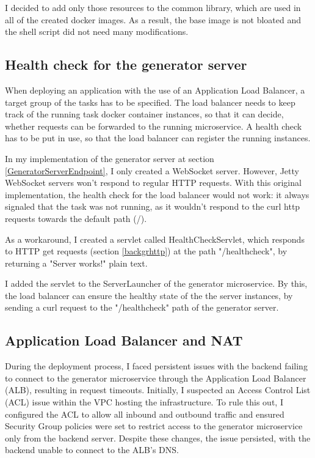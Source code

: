		I decided to add only those resources to the common library, which are used in all of the created docker images. 
		As a result, the base image is not bloated and the shell script did not need many modifications.

	\subsection{Health check for the generator server} \label{healthcheck}
		When deploying an application with the use of an Application Load Balancer, a target group of the tasks has to be specified.
		The load balancer needs to keep track of the running task docker container instances, so that it can decide, whether requests can be 
		forwarded to the running microservice. A health check has to be put in use, so that the load balancer can register the running instances.

		In my implementation of the generator server at section \ref{GeneratorServerEndpoint}, I only created a WebSocket server. However, Jetty 
		WebSocket servers won't respond to regular HTTP requests. With this original implementation, the health check for the load balancer would
		not work: it always signaled that the task was not running, as it wouldn't respond to the curl http requests towards the default path (/).

		As a workaround, I created a servlet called HealthCheckServlet, which responds to HTTP get requests (section \ref{backgrhttp}) at the path "/healthcheck",
		by returning a "Server works!" plain text.

		I added the servlet to the ServerLauncher of the generator microservice. By this, the load balancer can ensure the healthy state of the 
		the server instances, by sending a curl request to the "/healthcheck" path of the generator server.

	\subsection{Application Load Balancer and NAT} \label{ALB NAT}
		During the deployment process, I faced persistent issues with the backend failing to connect to the generator microservice 
		through the Application Load Balancer (ALB), resulting in request timeouts. Initially, I suspected an Access Control List (ACL) 
		issue within the VPC hosting the infrastructure. To rule this out, I configured the ACL to allow all inbound and outbound traffic 
		and ensured Security Group policies were set to restrict access to the generator microservice only from the backend server. 
		Despite these changes, the issue persisted, with the backend unable to connect to the ALB's DNS.

